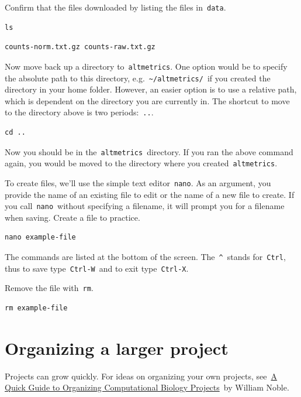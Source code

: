 \documentclass[
]{book}
\begin{document}
Confirm that the files downloaded by listing the files in~\texttt{data}.

\begin{verbatim}
ls
\end{verbatim}

\begin{verbatim}
counts-norm.txt.gz counts-raw.txt.gz
\end{verbatim}

Now move back up a directory to~\texttt{altmetrics}. One option would be to specify the absolute path to this directory, e.g.~\texttt{\textasciitilde{}/altmetrics/}~if you created the directory in your home folder. However, an easier option is to use a relative path, which is dependent on the directory you are currently in. The shortcut to move to the directory above is two periods:~\texttt{..}.

\begin{verbatim}
cd ..
\end{verbatim}

Now you should be in the~\texttt{altmetrics}~directory. If you ran the above command again, you would be moved to the directory where you created~\texttt{altmetrics}.

To create files, we'll use the simple text editor~\texttt{nano}. As an argument, you provide the name of an existing file to edit or the name of a new file to create. If you call~\texttt{nano}~without specifying a filename, it will prompt you for a filename when saving. Create a file to practice.

\begin{verbatim}
nano example-file
\end{verbatim}

The commands are listed at the bottom of the screen. The~\texttt{\^{}}~stands for~\texttt{Ctrl}, thus to save type~\texttt{Ctrl-W}~and to exit type~\texttt{Ctrl-X}.

Remove the file with~\texttt{rm}.

\begin{verbatim}
rm example-file
\end{verbatim}

\hypertarget{organizing-a-larger-project}{%
\section{Organizing a larger project}\label{organizing-a-larger-project}}

Projects can grow quickly. For ideas on organizing your own projects, see~\href{http://journals.plos.org/ploscompbiol/article?id=10.1371/journal.pcbi.1000424}{A Quick Guide to Organizing Computational Biology Projects}~by William Noble.
\end{document}
